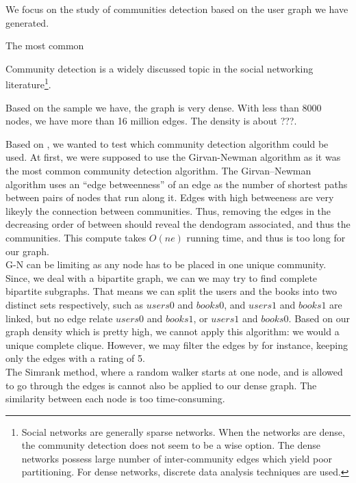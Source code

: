 \documentclass[11pt]{article}
\begin{document}
We focus on the study of communities detection based on the user graph we have generated.

The most common 

Community detection is a widely discussed topic in the social networking literature\footnote{Social networks are generally sparse networks. When the networks are dense, the community detection does not seem to be a wise option. The dense networks possess large number of inter-community edges which yield poor partitioning. For dense networks, discrete data analysis techniques are used.}\cite{clauset}.

Based on the sample we have, the graph is very dense.
With less than 8000 nodes, we have more than 16 million edges. The density is about ???.

Based on \cite{mining_massive_dataset}, we wanted to test which community detection algorithm could be used.
At first, we were supposed to use the Girvan-Newman algorithm as it was the most common community detection algorithm\cite{newman}.
The Girvan–Newman algorithm uses an ``edge betweenness'' of an edge as the number of shortest paths between pairs of nodes that run along it.
Edges with high betweeness are very likeyly the connection between communities.
Thus, removing the edges in the decreasing order of between should reveal the dendogram associated, and thus the communities.
This compute takes $O(ne)$ running time, and thus is too long for our graph.\\

G-N can be limiting as any node has to be placed in one unique community.
Since, we deal with a bipartite graph, we can we may try to find complete bipartite subgraphs.
That means we can split the users and the books into two distinct sets respectively, such as $users0$ and $books0$, and $users1$ and $books1$ are linked, but no edge relate $users0$ and $books1$, or $users1$ and $books0$.
Based on our graph density which is pretty high, we cannot apply this algorithm: we would a unique complete clique.
However, we may filter the edges by for instance, keeping only the edges with a rating of 5.\\

The Simrank method, where a random walker starts at one node, and is allowed to go through the edges is cannot also be applied to our dense graph.
The similarity between each node is too time-consuming. 

\end{document}
